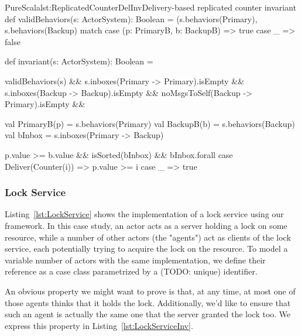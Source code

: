 \documentclass[a4paper,twoside]{article}
\newcommand{\TODO}[1]{\textcolor{YellowOrange}{(TODO: #1)}} %
\newcommand{\RefCode}[1]{Listing~\ref{#1}}
\begin{document}
\begin{Code}{PureScala}{lst:ReplicatedCounterDelInv}{Delivery-based replicated counter invariant}
def validBehaviors(s: ActorSystem): Boolean = {
  (s.behaviors(Primary), s.behaviors(Backup) match {
    case (p: PrimaryB, b: BackupB) => true
    case _                         => false
  }
}

def invariant(s: ActorSystem): Boolean = {
  validBehaviors(s)                       &&
  s.inboxes(Primary -> Primary).isEmpty   &&
  s.inboxes(Backup -> Backup).isEmpty     &&
  noMsgsToSelf(Backup -> Primary).isEmpty &&
  {
    val PrimaryB(p) = s.behaviors(Primary)
    val BackupB(b)  = s.behaviors(Backup)
    val bInbox      = s.inboxes(Primary -> Backup)

    p.value >= b.value && isSorted(bInbox) && bInbox.forall {
      case Deliver(Counter(i)) => p.value >= i
      case _                   => true
    }
  }
}
\end{Code}

\subsubsection{Lock Service}

\RefCode{lst:LockService} shows the implementation of a lock service using our framework. In this case study, an actor acts as a server holding a lock on some resource, while a number of other actors (the "agents") act as clients of the lock service, each potentially trying to acquire the lock on the resource. To model a variable number of actors with the same implementation, we define their reference as a case class parametrized by a \TODO{unique} identifier.

An obvious property we might want to prove is that, at any time, at most one of those agents thinks that it holds the lock. Additionally, we'd like to ensure that such an agent is actually the same one that the server granted the lock too. We express this property in \RefCode{lst:LockServiceInv}.
\end{document}
